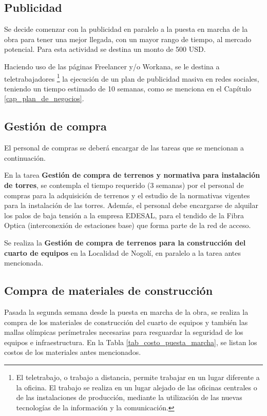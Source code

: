 \documentclass[12pt,a4paper]{book}
\begin{document}
\subsection{Publicidad}
Se decide comenzar con la publicidad en paralelo a la puesta en marcha de la obra para tener una mejor llegada, con un mayor rango de tiempo, al mercado potencial. Para esta actividad se destina un monto de 500 USD.

Haciendo uso de las páginas Freelancer y/o Workana, se le destina a teletrabajadores \footnote{El teletrabajo, o trabajo a distancia, permite trabajar en un lugar diferente a la oficina. El trabajo se realiza en un lugar alejado de las oficinas centrales o de las instalaciones de producción, mediante la utilización de las nuevas tecnologías de la información y la comunicación.} la ejecución de un plan de publicidad masiva en redes sociales, teniendo un tiempo estimado de 10 semanas, como se menciona en el Capítulo \ref{cap_plan_de_negocios}.
 
\subsection{Gestión de compra}

El personal de compras se deberá encargar de las tareas que se mencionan a continuación.

\medskip 

En la tarea \textbf{Gestión de compra de terrenos y normativa para instalación de torres}, se contempla el tiempo requerido (3 semanas) por el personal de compras para la adquisición de terrenos y el estudio de la normativas vigentes para la instalación de las torres. Además, el personal debe encargarse de alquilar los palos de baja tensión a la empresa EDESAL, para el tendido de la Fibra Optica (interconexión de estaciones base) que forma parte de la red de acceso.

Se realiza la \textbf{Gestión de compra de terrenos para la construcción del cuarto de equipos} en la Localidad de Nogolí, en paralelo a la tarea antes mencionada.


\subsection{Compra de materiales de construcción}
Pasada la segunda semana desde la puesta en marcha de la obra, se realiza la compra de los materiales de construcción del cuarto de equipos y también las mallas olímpicas perímetrales necesarias para resguardar la seguridad de los equipos e infraestructura. En la Tabla \ref{tab_costo_puesta_marcha}, se listan los costos de los materiales antes mencionados.
\end{document}
